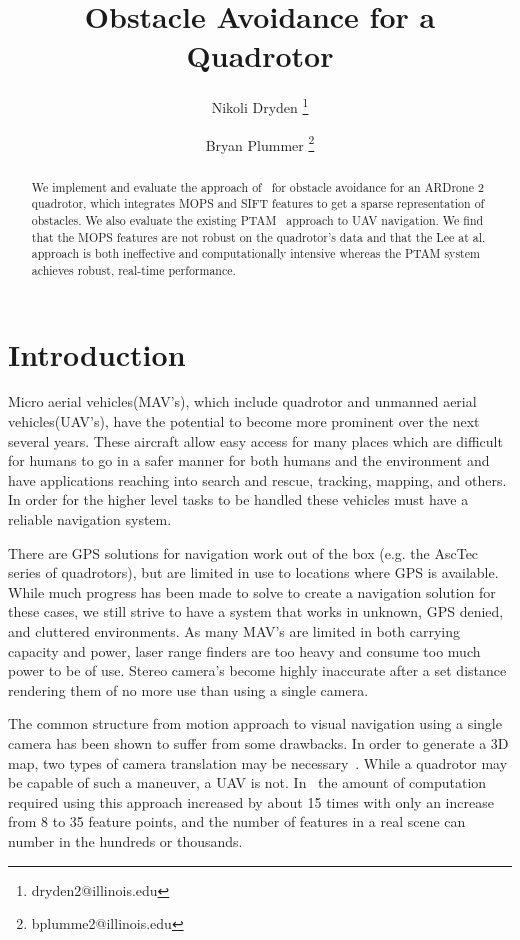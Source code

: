 \documentclass{acmsiggraph}
\title{Obstacle Avoidance for a Quadrotor}
\author{Nikoli Dryden \thanks{dryden2@illinois.edu} %
\and Bryan Plummer \thanks{bplumme2@illinois.edu}}
\begin{document}
\maketitle

\begin{abstract}
We implement and evaluate the approach of~\cite{lee2011} for obstacle avoidance for an ARDrone 2 quadrotor, which integrates MOPS and SIFT features to get a sparse representation of obstacles. We also evaluate the existing PTAM~\cite{klein07parallel} approach to UAV navigation. We find that the MOPS features are not robust on the quadrotor's data and that the Lee at al. approach is both ineffective and computationally intensive whereas the PTAM system achieves robust, real-time performance.
\end{abstract}

\section{Introduction}
Micro aerial vehicles(MAV's), which include quadrotor and unmanned aerial vehicles(UAV's), have the potential to become more 
prominent over the next several years.  These aircraft allow easy access for many places which are difficult for humans 
to go in a safer manner for both humans and the environment and have applications reaching into search and rescue, tracking,
mapping, and others.  In order for the higher level tasks to be handled these vehicles must have a reliable 
navigation system.

There are GPS solutions for navigation work out of the box (e.g. the AscTec series of quadrotors), but are limited in use
to locations where GPS is available.  While much progress has been made to solve to create a navigation solution
for these cases, we still strive to have a system that works in unknown, GPS denied, and cluttered environments.  As many 
MAV's are limited in both carrying capacity and power, laser range finders are too heavy and consume too much power to be of 
use. Stereo camera's become highly inaccurate after a set distance rendering them of no more use than using a single camera.

The common structure from motion approach to visual navigation using a single camera has been shown to suffer from some 
drawbacks.  In order to generate a 3D map, two types of camera translation may be necessary~\cite{shah2010}.  While
a quadrotor may be capable of such a maneuver, a UAV is not.  In~\cite{shah2009} the amount of computation required using this 
approach increased by about 15 times with only an increase from 8 to 35 feature points, and the number of features in a real
scene can number in the hundreds or thousands.
\end{document}
